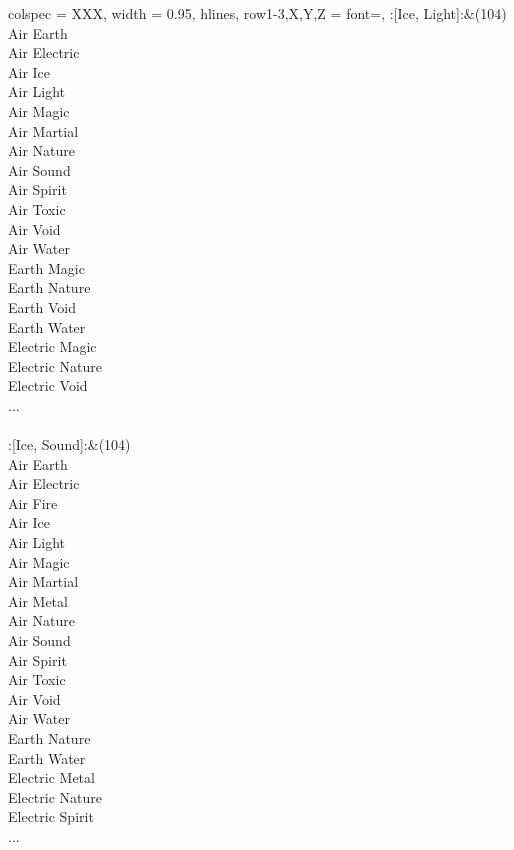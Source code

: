 \begin{longtblr}[
	caption = {2v2 Defending Weak},
	label = {2v2-Defending-Weak},
]{
	colspec = {XXX}, width = 0.95\linewidth,
	hlines,
	row{1-3,X,Y,Z} = {font=\bfseries},
}
	:[Ice, Light]:&{(104)\\
	Air Earth \\
	Air Electric \\
	Air Ice \\
	Air Light \\
	Air Magic \\
	Air Martial \\
	Air Nature \\
	Air Sound \\
	Air Spirit \\
	Air Toxic \\
	Air Void \\
	Air Water \\
	Earth Magic \\
	Earth Nature \\
	Earth Void \\
	Earth Water \\
	Electric Magic \\
	Electric Nature \\
	Electric Void \\
	...\\
	}\\

	:[Ice, Sound]:&{(104)\\
	Air Earth \\
	Air Electric \\
	Air Fire \\
	Air Ice \\
	Air Light \\
	Air Magic \\
	Air Martial \\
	Air Metal \\
	Air Nature \\
	Air Sound \\
	Air Spirit \\
	Air Toxic \\
	Air Void \\
	Air Water \\
	Earth Nature \\
	Earth Water \\
	Electric Metal \\
	Electric Nature \\
	Electric Spirit \\
	...\\
	}\\


\end{longtblr}

